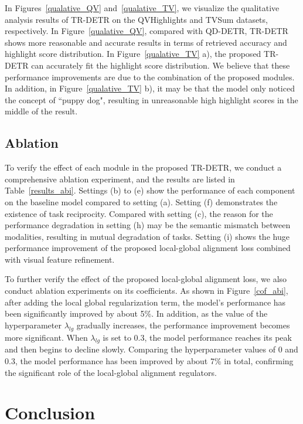 In Figures~\ref{qualative_QV} and~\ref{qualative_TV}, we visualize the qualitative analysis results of TR-DETR on the QVHighlights and TVSum datasets, respectively. In Figure~\ref{qualative_QV}, compared with QD-DETR, TR-DETR shows more reasonable and accurate results in terms of retrieved accuracy and highlight score distribution. In Figure~\ref{qualative_TV} a), the proposed TR-DETR can accurately fit the highlight score distribution. We believe that these performance improvements are due to the combination of the proposed modules. In addition, in Figure~\ref{qualative_TV} b), it may be that the model only noticed the concept of ``puppy dog", resulting in unreasonable high highlight scores in the middle of the result.

\subsection{Ablation}

To verify the effect of each module in the proposed TR-DETR, we conduct a comprehensive ablation experiment, and the results are listed in Table~\ref{results_abi}. Settings (b) to (e) show the performance of each component on the baseline model compared to setting (a). Setting (f) demonstrates the existence of task reciprocity. Compared with setting (c), the reason for the performance degradation in setting (h) may be the semantic mismatch between modalities, resulting in mutual degradation of tasks. Setting (i) shows the huge performance improvement of the proposed local-global alignment loss combined with visual feature refinement.

To further verify the effect of the proposed local-global alignment loss, we also conduct ablation experiments on its coefficients. As shown in Figure~\ref{cof_abi}, after adding the local global regularization term, the model's performance has been significantly improved by about 5\%. In addition, as the value of the hyperparameter $\lambda_{lg}$ gradually increases, the performance improvement becomes more significant. When $\lambda_{lg}$ is set to 0.3, the model performance reaches its peak and then begins to decline slowly. Comparing the hyperparameter values of 0 and 0.3, the model performance has been improved by about 7\% in total, confirming the significant role of the local-global alignment regulators.

\section{Conclusion}

